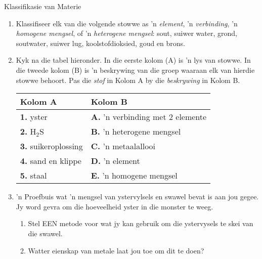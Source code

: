 \begin{eocexercises}{Klassifikasie van Materie}
{\begin{enumerate}[noitemsep, label=\textbf{\arabic*}. ]
    \item Klassifiseer elk van die volgende stowwe as 'n \textsl{element}, 'n \textsl{verbinding}, 'n \textsl{homogene mengsel}, of 'n \textsl{heterogene mengsel}: sout, suiwer water, grond, soutwater, suiwer lug, koolstofdioksied, goud en brons.\newline
    \item Kyk na die tabel hieronder. In die eerste kolom (A) is 'n lys van stowwe. In die tweede kolom (B) is 'n beskrywing van die groep waaraan elk van hierdie stowwe behoort. Pas die \textsl{stof} in Kolom A by die \textsl{beskrywing} in Kolom B.
\begin{table}[H]
\begin{center}
\label{m38706*id68147}
\begin{tabular}{|l|l|}\hline
\textbf{Kolom A} & \textbf{Kolom B} \\ \hline
\textbf{1.} yster & \textbf{A.} 'n verbinding met 2 elemente \\ \hline
\textbf{2.} H$_\text{2}$S & \textbf{B.} 'n heterogene mengsel \\ \hline
\textbf{3.} suikeroplossing & \textbf{C.} 'n metaalallooi \\ \hline
\textbf{4.} sand en klippe & \textbf{D.} 'n element \\ \hline
\textbf{5.} staal & \textbf{E.} 'n homogene mengsel \\ \hline
\end{tabular}
\end{center}
\end{table}
\par
\item 'n Proefbuis wat 'n mengsel van ystervylsels en swawel bevat is aan jou gegee. Jy word gevra om die hoeveelheid yster in die monster te weeg. 
\begin{enumerate}[noitemsep, label=\textbf{\alph*}. ] 
\item Stel EEN metode voor wat jy kan gebruik om die ystervysels te skei van die swawel.
\item Watter eienskap van metale laat jou toe om dit te doen?

\end{enumerate}
\end{enumerate}}
\end{eocexercises}
